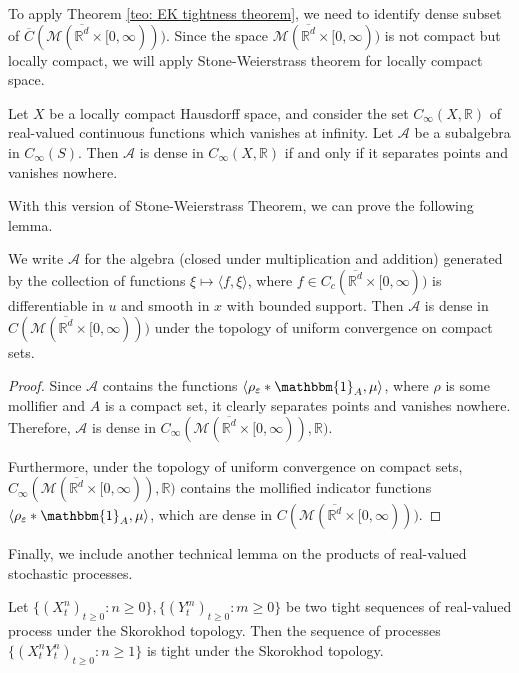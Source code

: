 To apply Theorem \ref{teo: EK tightness theorem},
we need to identify dense subset of $\overline{C}(\mathcal{M}(\overline{\mathbb{R}^d} \times [0,\infty)))$.
Since the space $\mathcal{M}(\overline{\mathbb{R}^d} \times [0,\infty))$ is not compact but locally compact,
we will apply Stone-Weierstrass theorem for locally compact space.

\begin{lemma}
\label{lem: SW locally compact}
Let $X$ be a locally compact Hausdorff space, and consider the set  $C_{\infty}(X, \mathbb{R})$ of real-valued continuous functions which vanishes at infinity. 
Let $\mathcal{A}$ be a subalgebra in $C_{\infty}(S)$. Then $\mathcal{A}$ is dense in $C_{\infty}(X, \mathbb{R})$ if and only if it separates points and vanishes nowhere.
\end{lemma}

With this version of Stone-Weierstrass Theorem, we can prove the following lemma.
\begin{lemma}
\label{lem: uniform compact density}
We write $\mathcal{A}$ for the algebra (closed under multiplication and addition) generated by 
the collection of functions $\xi \mapsto \langle f, \xi \rangle$, where $ f \in C_c(\overline{\mathbb{R}^d} \times [0,\infty))$ is differentiable in $u$ and smooth in $x$ with bounded support.
Then $\mathcal{A}$ is dense in $C(\mathcal{M}(\overline{\mathbb{R}^d} \times [0,\infty)))$ under the topology of uniform convergence on compact sets.
\end{lemma}
\begin{proof}
Since $\mathcal{A}$ contains the functions $\langle \rho_{\varepsilon}*\mathbbm{1}_{A} , \mu \rangle$,
where $\rho$ is some mollifier and $A$ is a compact set, it clearly
separates points and vanishes nowhere.
Therefore, $\mathcal{A}$ is dense in $C_{\infty}(\mathcal{M}(\overline{\mathbb{R}^d} \times [0,\infty)), \mathbb{R})$.

Furthermore, under the topology of uniform convergence on compact sets, 
$C_{\infty}(\mathcal{M}(\overline{\mathbb{R}^d} \times [0,\infty)), \mathbb{R})$ 
contains the mollified indicator functions $\langle \rho_{\varepsilon}*\mathbbm{1}_{A} , \mu \rangle$,
which are dense in $C(\mathcal{M}(\overline{\mathbb{R}^d} \times [0,\infty)))$.
\end{proof}

Finally, we include another technical lemma on the products of real-valued stochastic processes. 
\begin{lemma}
\label{teo: product tightness}
Let $\{(X^n_t)_{t \geq 0}: n \geq 0\}, \{(Y^m_t)_{t \geq 0}: m \geq 0\}$ be two tight sequences of real-valued process under the Skorokhod topology.
Then the sequence of processes $\{(X^n_tY^n_t)_{t \geq 0}: n \geq 1\}$ is tight under the Skorokhod topology.
\end{lemma}

